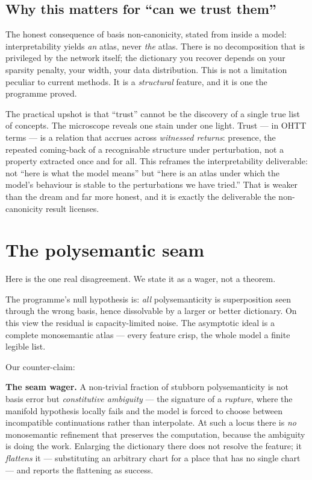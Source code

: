 \documentclass[11pt,a4paper]{article}
\begin{document}
\subsection{Why this matters for ``can we trust them''}

The honest consequence of basis non-canonicity, stated from inside a model: interpretability
yields \emph{an} atlas, never \emph{the} atlas. There is no decomposition that is privileged by
the network itself; the dictionary you recover depends on your sparsity penalty, your width,
your data distribution. This is not a limitation peculiar to current methods. It is a
\emph{structural} feature, and it is one the programme proved.

The practical upshot is that ``trust'' cannot be the discovery of a single true list of
concepts. The microscope reveals one stain under one light. Trust --- in OHTT terms ---
is a relation that accrues across \emph{witnessed returns}: presence, the repeated coming-back
of a recognisable structure under perturbation, not a property extracted once and for all. This
reframes the interpretability deliverable: not ``here is what the model means'' but ``here is an
atlas under which the model's behaviour is stable to the perturbations we have tried.'' That is
weaker than the dream and far more honest, and it is exactly the deliverable the
non-canonicity result licenses.

\section{The polysemantic seam}

Here is the one real disagreement. We state it as a wager, not a theorem.

The programme's null hypothesis is: \emph{all} polysemanticity is superposition seen through the
wrong basis, hence dissolvable by a larger or better dictionary. On this view the residual is
capacity-limited noise. The asymptotic ideal is a complete monosemantic atlas --- every feature
crisp, the whole model a finite legible list.

Our counter-claim:

\begin{claimbox}
\textbf{The seam wager.}
A non-trivial fraction of stubborn polysemanticity is not basis error but \emph{constitutive
ambiguity} --- the signature of a \emph{rupture}, where the manifold hypothesis locally fails and
the model is forced to choose between incompatible continuations rather than interpolate. At such
a locus there is \emph{no} monosemantic refinement that preserves the computation, because the
ambiguity is doing the work. Enlarging the dictionary there does not resolve the feature; it
\emph{flattens} it --- substituting an arbitrary chart for a place that has no single chart ---
and reports the flattening as success.
\end{claimbox}
\end{document}
